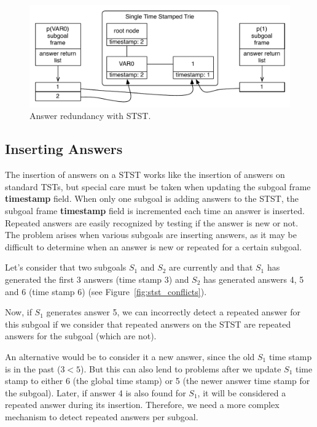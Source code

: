 \begin{figure}[ht]
  \centering
    \includegraphics[scale=0.6]{stst_redundant.pdf}
  \caption{Answer redundancy with STST.}
  \label{fig:stst_redundant}
\end{figure}

\subsection{Inserting Answers}

The insertion of answers on a STST works like the insertion of answers on standard TSTs, but special care
must be taken when updating the subgoal frame \textbf{timestamp} field.
When only one subgoal is adding answers to the STST, the subgoal frame \textbf{timestamp} field
is incremented each time an answer is inserted. Repeated answers are easily recognized
by testing if the answer is new or not. The problem arises when various subgoals are inserting answers,
as it may be difficult to determine when an answer is new or repeated for a certain subgoal.

Let's consider that two subgoals $S_1$ and $S_2$ are currently and that $S_1$ has generated the
first 3 answers (time stamp 3) and $S_2$ has generated answers 4, 5 and 6 (time stamp 6) (see
Figure~\ref{fig:stst_conflicts}).

Now, if $S_1$ generates answer 5, we can incorrectly detect a repeated answer
for this subgoal if we consider that repeated answers on the STST are repeated answers for the
subgoal (which are not).

An alternative would be to consider it a new answer, since the old $S_1$ time stamp
is in the past ($3 < 5$). But this can also lend to problems after we update $S_1$ time stamp
to either 6 (the global time stamp) or 5 (the newer answer time stamp for the subgoal).
Later, if answer 4 is also found for $S_1$, it will be considered a repeated answer
during its insertion. Therefore, we need a more complex mechanism to
detect repeated answers per subgoal.

